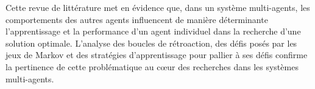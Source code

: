 \documentclass{article}
\theoremstyle{definition}
\begin{document}
Cette revue de littérature met en évidence que, dans un système multi-agents, les comportements des autres agents influencent de manière déterminante l’apprentissage et la performance d’un agent individuel dans la recherche d’une solution optimale. L’analyse des boucles de rétroaction, des défis posés par les jeux de Markov et des stratégies d’apprentissage pour pallier à ses défis confirme la pertinence de cette problématique au cœur des recherches dans les systèmes multi-agents.






\end{document}
